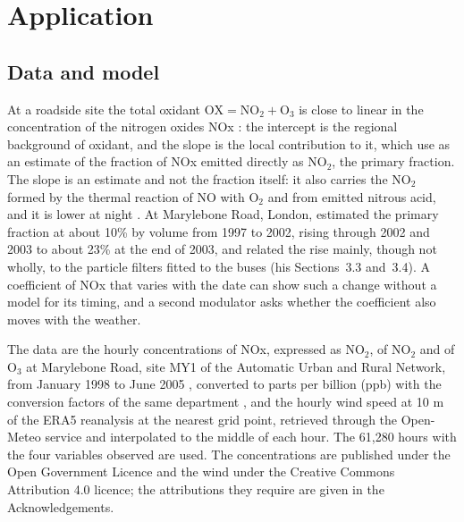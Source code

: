\documentclass[12pt]{article} %
\theoremstyle{definition}
\theoremstyle{plain}
\begin{document}
{\color{colR1}
\section{Application}
\label{sec:application}

\subsection{Data and model}
\label{sec:app-data}

At a roadside site the total oxidant $\mathrm{OX} = \mathrm{NO_2} +
\mathrm{O_3}$ is close to linear in the concentration of the nitrogen oxides
NOx \citep[Section~2.3]{Clapp-Jenkin-2001}: the intercept is the regional
background of oxidant, and the slope is the local contribution to it, which
\citet[Section~2.4]{Carslaw-Beevers-2005} use as an estimate of the fraction
of NOx emitted directly as $\mathrm{NO_2}$, the primary fraction. The slope
is an estimate and not the fraction itself: it also carries the
$\mathrm{NO_2}$ formed by the thermal reaction of NO with $\mathrm{O_2}$ and
from emitted nitrous acid, and it is lower at night
\citep[Section~2.3]{Clapp-Jenkin-2001}. At Marylebone Road, London,
\citet[Sections~3.1 and 3.2, Figure~3(a)]{Carslaw-2005} estimated the primary
fraction at about 10\% by volume from 1997 to 2002, rising through 2002 and
2003 to about 23\% at the end of 2003, and related the rise mainly, though not
wholly, to the particle filters fitted to the buses (his Sections~3.3
and~3.4). A coefficient of NOx that varies with the date can show such a
change without a model for its timing, and a second modulator asks whether
the coefficient also moves with the weather.

The data are the hourly concentrations of NOx, expressed as $\mathrm{NO_2}$,
of $\mathrm{NO_2}$ and of $\mathrm{O_3}$ at Marylebone Road, site MY1 of the
Automatic Urban and Rural Network, from January 1998 to June 2005
\citep{Defra-UKAIR-2026}, converted to parts per billion (ppb) with the
conversion factors of the same department \citep{Defra-2005}, and the hourly wind speed at 10 m of the ERA5
reanalysis \citep{Hersbach-2020,Hersbach-ERA5-2023} at the nearest grid point,
retrieved through the Open-Meteo service \citep{Zippenfenig-OpenMeteo-2024}
and interpolated to the middle of each hour. The 61,280 hours with the four
variables observed are used. The concentrations are published under the Open
Government Licence and the wind under the Creative Commons Attribution 4.0
licence; the attributions they require are given in the Acknowledgements.

}
\end{document}
